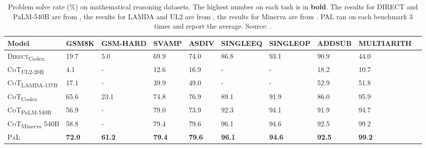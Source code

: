 \begin{table}[h!]
	\centering
	\tiny
	\begin{tabularx}{\textwidth}{XXXXXXXXXX}
		\hline
		\textbf{Model}                           & \textbf{GSM8K} & \textbf{GSM-HARD} & \textbf{SVAMP} & \textbf{ASDIV} & \textbf{SINGLEEQ} & \textbf{SINGLEOP} & \textbf{ADDSUB} & \textbf{MULTIARITH} \\ \hline
		\textsc{Direct}\textsubscript{Codex}     & 19.7           & 5.0               & 69.9           & 74.0           & 86.8              & 93.1              & 90.9            & 44.0                \\
		\textsc{CoT}\textsubscript{UL2-20B}      & 4.1            & -                 & 12.6           & 16.9           & -                 & -                 & 18.2            & 10.7                \\
		\textsc{CoT}\textsubscript{LAMDA-137B}   & 17.1           & -                 & 39.9           & 49.0           & -                 & -                 & 52.9            & 51.8                \\
		\textsc{CoT}\textsubscript{Codex}        & 65.6           & 23.1              & 74.8           & 76.9           & 89.1              & 91.9              & 86.0            & 95.9                \\
		\textsc{CoT}\textsubscript{PaLM-540B}    & 56.9           & -                 & 79.0           & 73.9           & 92.3              & 94.1              & 91.9            & 94.7                \\
		\textsc{CoT}\textsubscript{Minerva} 540B & 58.8           & -                 & 79.4           & 79.6           & 96.1              & 94.6              & 92.5            & 99.2                \\
		\textsc{PaL}                             & \textbf{72.0}  & \textbf{61.2}     & \textbf{79.4}  & \textbf{79.6}  & \textbf{96.1}     & \textbf{94.6}     & \textbf{92.5}   & \textbf{99.2}       \\ \hline
	\end{tabularx}
	\caption{Problem solve rate (\%) on mathematical reasoning datasets. The highest number on each task is in \textbf{bold}. The results for DIRECT and PaLM-540B are from \textcite{wei2022chain}, the results for LAMDA and UL2 are from \textcite{wang2022self}, the results for Minerva are from \textcite{lewkowycz2022minerva}. PAL ran on each benchmark 3 times and report the average. Source: \textcite{gao2022pal}.}
	\label{tab:pal-math}
\end{table}
